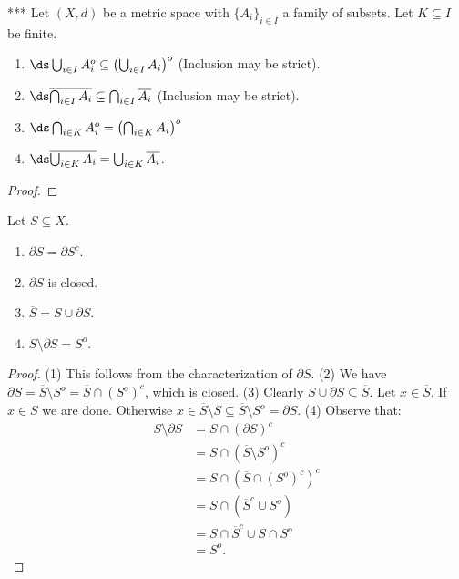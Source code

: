     \begin{proposition}***
        Let $(X,d)$ be a metric space with $\{A_i\}_{i \in I}$ a family of subsets. Let $K \subseteq I$ be finite.
        \begin{enumerate}[label = (\arabic*),itemsep=5pt,topsep=8pt]
            \item $\ds \bigcup_{i \in I}A_i^o \subseteq \left( \bigcup_{i \in I}A_i \right)^o$ (Inclusion may be strict). 
            \item $\ds \overline{\bigcap_{i \in I} A_i} \subseteq \bigcap_{i \in I}\overline{A_i}$ (Inclusion may be strict). 
            \item $\ds \bigcap_{i \in K}A_i^o = \left( \bigcap_{i \in K}A_i \right)^o$
            \item $\ds \overline{\bigcup_{i \in K}A_i} = \bigcup_{i \in K}\overline{A_i}$.
        \end{enumerate}
    \end{proposition}
        \begin{proof}

        \end{proof}

    \begin{proposition}
        Let $S \subseteq X$.
        \begin{enumerate}[label = (\arabic*),itemsep=1pt,topsep=3pt]
            \item $\partial S = \partial S^c$.
            \item $\partial S$ is closed.
            \item $\overline{S} = S \cup \partial S$.
            \item $S \setminus \partial S = S^o$.
        \end{enumerate}
    \end{proposition}
        \begin{proof}
            (1) This follows from the characterization of $\partial S$. (2) We have $\partial S = \overline{S} \setminus S^o = \overline{S} \cap (S^o)^c$, which is closed. (3) Clearly $S \cup \partial S \subseteq \overline{S}$. Let $x \in \overline{S}$. If $x \in S$ we are done. Otherwise $x \in \overline{S} \setminus S \subseteq \overline{S} \setminus S^o = \partial S$. (4) Observe that:
                \begin{equation*}
                \begin{split}
                    S \setminus \partial S 
                    & = S \cap (\partial S) ^c \\
                    & = S \cap (\overline{S} \setminus S^o)^c \\
                    & = S \cap (\overline {S} \cap (S^o)^c)^c \\
                    & = S \cap (\overline{S}^c \cup S^o ) \\
                    & = S \cap \overline{S}^c \cup S \cap S^o \\
                    & = S^o.
                \end{split}
                \end{equation*}
        \end{proof}

